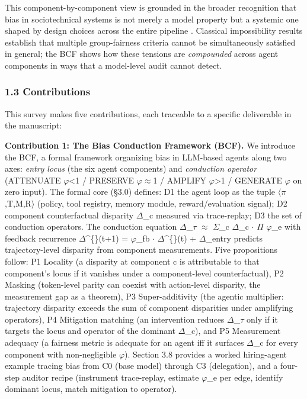 \documentclass[10pt]{article}
\begin{document}
This component-by-component view is grounded in the broader recognition that bias in sociotechnical systems is not merely a model property but a systemic one shaped by design choices across the entire pipeline \cite{selbst2019fairness,blodgett2020language}. Classical impossibility results \cite{kleinberg2017inherent,chouldechova2017fair} establish that multiple group-fairness criteria cannot be simultaneously satisfied in general; the BCF shows how these tensions are \emph{compounded} across agent components in ways that a model-level audit cannot detect.

\subsubsection*{1.3 Contributions}

This survey makes five contributions, each traceable to a specific deliverable in the manuscript:

\textbf{Contribution 1: The Bias Conduction Framework (BCF).} We introduce the BCF, a formal framework organizing bias in LLM-based agents along two axes: \emph{entry locus} (the six agent components) and \emph{conduction operator} (ATTENUATE $\varphi$<1 / PRESERVE $\varphi$$\approx$1 / AMPLIFY $\varphi$>1 / GENERATE $\varphi$ on zero input). The formal core (\S{}3.0) defines: D1 the agent loop as the tuple $\langle$$\pi$,T,M,R$\rangle$ (policy, tool registry, memory module, reward/evaluation signal); D2 component counterfactual disparity $\Delta$\_c measured via trace-replay; D3 the set of conduction operators. The conduction equation $\Delta$\_$\tau$ $\approx$ $\Sigma$\_c $\Delta$\_c $\cdot$ $\Pi$ $\varphi$\_e with feedback recurrence $\Delta$\textasciicircum\{\}(t+1) = $\varphi$\_fb $\cdot$ $\Delta$\textasciicircum\{\}(t) + $\Delta$\_entry predicts trajectory-level disparity from component measurements. Five propositions follow: P1 Locality (a disparity at component c is attributable to that component's locus if it vanishes under a component-level counterfactual), P2 Masking (token-level parity can coexist with action-level disparity, the measurement gap as a theorem), P3 Super-additivity (the agentic multiplier: trajectory disparity exceeds the sum of component disparities under amplifying operators), P4 Mitigation matching (an intervention reduces $\Delta$\_$\tau$ only if it targets the locus and operator of the dominant $\Delta$\_c), and P5 Measurement adequacy (a fairness metric is adequate for an agent iff it surfaces $\Delta$\_c for every component with non-negligible $\varphi$). Section 3.8 provides a worked hiring-agent example tracing bias from C0 (base model) through C3 (delegation), and a four-step auditor recipe (instrument trace-replay, estimate $\varphi$\_e per edge, identify dominant locus, match mitigation to operator).
\end{document}
